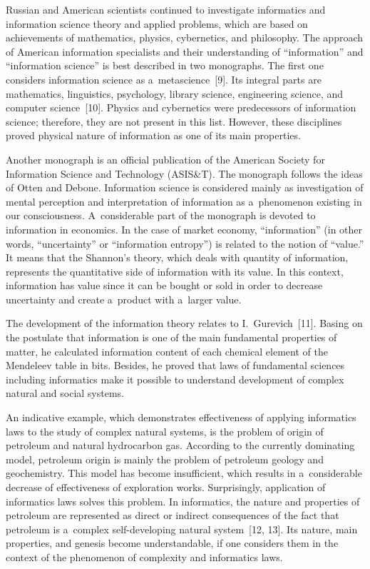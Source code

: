 \begin{multicols}{2}
    Russian and American scientists continued to investigate informatics and 
information science theory and applied problems, which are based on 
achievements of mathematics, physics, cybernetics, and philosophy. The approach 
of American information specialists and their understanding of ``information'' and 
``information science'' is best described in two monographs. The first one considers 
information science as a~metascience~[9]. Its integral parts are mathematics, 
linguistics, psychology, library science, engineering science, and computer 
science~[10]. Physics and cybernetics were predecessors of information science; 
therefore, they are not present in this list. However, these disciplines proved 
physical nature of information as one of its main properties.
    
    Another monograph is an official publication of the American Society for 
Information Science and Technology (ASIS\&T). The monograph follows the 
ideas of Otten and Debone. Information science is considered mainly as 
investigation of mental perception and interpretation of information as 
a~phenomenon existing in our consciousness. A~considerable part of the 
monograph is devoted to information in economics. In the case of market 
economy, ``information'' (in other words, ``uncertainty'' or ``information entropy'') 
is related to the notion of ``value.'' It means that the Shannon's theory, which deals 
with quantity of information, represents the quantitative side of information with 
its value. In this context, information has value since it can be bought or sold in 
order to decrease uncertainty and create a~product with a~larger value.
   
   The development of the information theory relates to I.~Gurevich~[11]. Basing 
on the postulate that information is one of the main fundamental properties of 
matter, he calculated information content of each chemical element of the 
Mendeleev table in bits. Besides, he proved that laws of fundamental sciences 
including informatics make it possible to understand development of complex 
natural and social systems.
{

}
   
   An indicative example, which demonstrates effectiveness of applying 
informatics laws to the study of complex natural systems, is the problem of origin 
of petroleum and natural hydrocarbon gas. According to the currently dominating 
model, petroleum origin is mainly the problem of petroleum geology and 
geochemistry. This model has become insufficient, which results in a~considerable 
decrease of effectiveness of exploration works. Surprisingly, application of 
informatics laws solves this problem. In informatics, the nature and properties of 
petroleum are represented as direct or indirect consequences of the fact that 
petroleum is a~complex self-developing natural system~[12, 13]. Its nature, main 
properties, and genesis become understandable, if one considers them in the 
context of the phenomenon of complexity and informatics laws.
   

\end{multicols}
